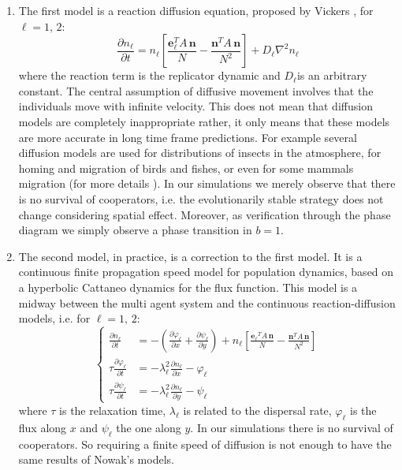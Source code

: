 \begin{enumerate}
\item The first model is a reaction diffusion equation, proposed by Vickers
\cite{vickers_spatial_1989}, for $\ell=1,\,2$:
\[
\frac{\partial n_{\ell}}{\partial t}=n_{\ell}\left[\frac{\mathbf{e}_{\ell}^{T}A\,\mathbf{n}}{N}-\frac{\mathbf{n}^{T}A\,\mathbf{n}}{N^{2}}\right]+D_{\ell}\nabla^{2}n_{\ell}
\]
where the reaction term is the replicator dynamic and $D_{\ell}$is
an arbitrary constant. The central assumption of diffusive movement
involves that the individuals move with infinite velocity. This does
not mean that diffusion models are completely inappropriate rather,
it only means that these models are more accurate in long time frame
predictions. For example several diffusion models are used for distributions
of insects in the atmosphere, for homing and migration of birds and
fishes, or even for some mammals migration (for more details \cite{murray1,murray2,Okubo_Levin}).
In our simulations we merely observe that there is no survival of
cooperators, i.e. the evolutionarily stable strategy does not change
considering spatial effect. Moreover, as verification through the
phase diagram we simply observe a phase transition in $b=1$.
\item The second model, in practice, is a correction to the first model.
It is a continuous finite propagation speed model for population dynamics,
based on a hyperbolic Cattaneo dynamics for the flux function. This
model is a midway between the multi agent system and the continuous
reaction-diffusion models, i.e. for $\ell=1,\,2$:
\[
\begin{cases}
\frac{\partial n_{\ell}}{\partial t} & =-\left(\frac{\partial\varphi_{\ell}}{\partial x}+\frac{\partial\psi_{\ell}}{\partial y}\right)+n_{\ell}\left[\frac{\mathbf{e_{\ell}}^{T}A\,\mathbf{n}}{N}-\frac{\mathbf{n}^{T}A\,\mathbf{n}}{N^{2}}\right]\\
\tau\frac{\partial\varphi_{\ell}}{\partial t} & =-\lambda_{\ell}^{2}\frac{\partial n_{\ell}}{\partial x}-\varphi_{\ell}\\
\tau\frac{\partial\psi_{\ell}}{\partial t} & =-\lambda_{\ell}^{2}\frac{\partial n_{\ell}}{\partial y}-\psi_{\ell}
\end{cases}
\]
where $\tau$ is the relaxation time, $\lambda_{\ell}$ is related
to the dispersal rate, $\varphi_{\ell}$ is the flux along $x$ and
$\psi_{\ell}$ the one along $y$. In our simulations there is no
survival of cooperators. So requiring a finite speed of diffusion
is not enough to have the same results of Nowak's models.

\end{enumerate}
